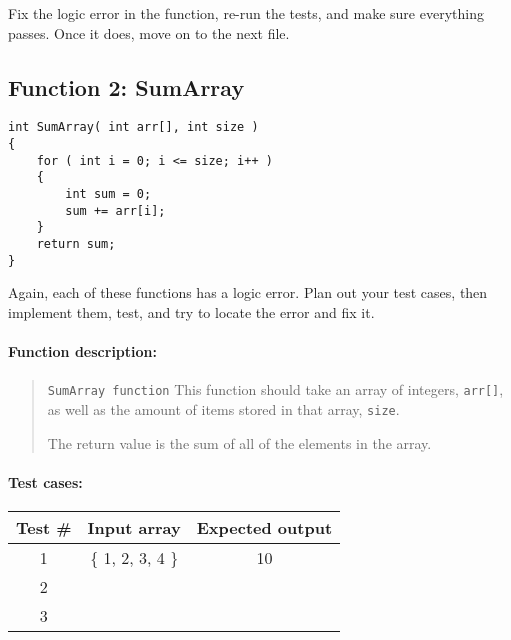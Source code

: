 Fix the logic error in the function, re-run the tests, and make sure everything passes.
Once it does, move on to the next file.

\hrulefill

\subsection{Function 2: SumArray}

\begin{lstlisting}[style=code]
int SumArray( int arr[], int size )
{
    for ( int i = 0; i <= size; i++ )
    {
        int sum = 0;
        sum += arr[i];
    }
    return sum;
}
\end{lstlisting}

Again, each of these functions has a logic error. Plan out your test cases,
then implement them, test, and try to locate the error and fix it.

\paragraph{Function description:}

\begin{quote}
    \texttt{SumArray function}
    This function should take an array of integers, \texttt{arr[]}, as
    well as the amount of items stored in that array, \texttt{size}.

    The return value is the sum of all of the elements in the array.
\end{quote}

\paragraph{Test cases:}

\begin{center}
    \begin{tabular}{c | c | c}
        \textbf{Test \#} &
        \textbf{Input array} &
        \textbf{Expected output}
        \\ \hline
        1 & \{ 1, 2, 3, 4 \} & 10
        \\ \hline
        2 & & \\ \hline
        3 & & \\ \hline
    \end{tabular}
\end{center}

